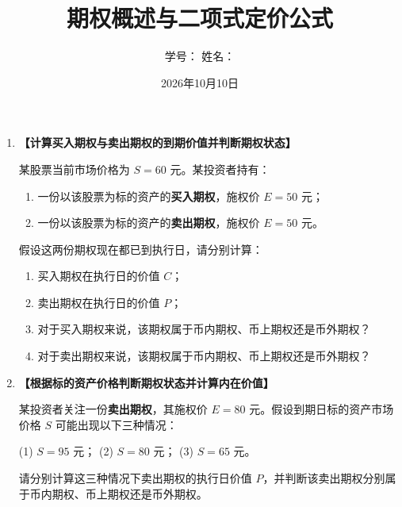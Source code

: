 \documentclass[10pt]{article}
\author{学号：\underline{\hspace{4cm}} 姓名：\underline{\hspace{4cm}} }
\title{期权概述与二项式定价公式}
\date{2026年10月10日}
\begin{document}
\maketitle

\begin{enumerate}[label=\textbf{\arabic*.}]


\item  {\bf{【计算买入期权与卖出期权的到期价值并判断期权状态】}} %

某股票当前市场价格为 \(S = 60\) 元。某投资者持有：

\begin{enumerate}[label=(\arabic*)]
    \item 一份以该股票为标的资产的\textbf{买入期权}，施权价 \(E = 50\) 元；
    \item 一份以该股票为标的资产的\textbf{卖出期权}，施权价 \(E = 50\) 元。
\end{enumerate}

假设这两份期权现在都已到执行日，请分别计算：

\begin{enumerate}[label=(\arabic*)]
    \item 买入期权在执行日的价值 \(C\)；
    \item 卖出期权在执行日的价值 \(P\)；
    \item 对于买入期权来说，该期权属于币内期权、币上期权还是币外期权？
    \item 对于卖出期权来说，该期权属于币内期权、币上期权还是币外期权？
\end{enumerate}

\vspace{0cm}

\item  {\bf{【根据标的资产价格判断期权状态并计算内在价值】}} %

某投资者关注一份\textbf{卖出期权}，其施权价 \(E = 80\) 元。假设到期日标的资产市场价格 \(S\) 可能出现以下三种情况：

(1) \(S = 95\) 元；
(2) \(S = 80\) 元；
(3) \(S = 65\) 元。

请分别计算这三种情况下卖出期权的执行日价值 \(P\)，并判断该卖出期权分别属于币内期权、币上期权还是币外期权。

\vspace{0cm}


\end{enumerate}
\end{document}
